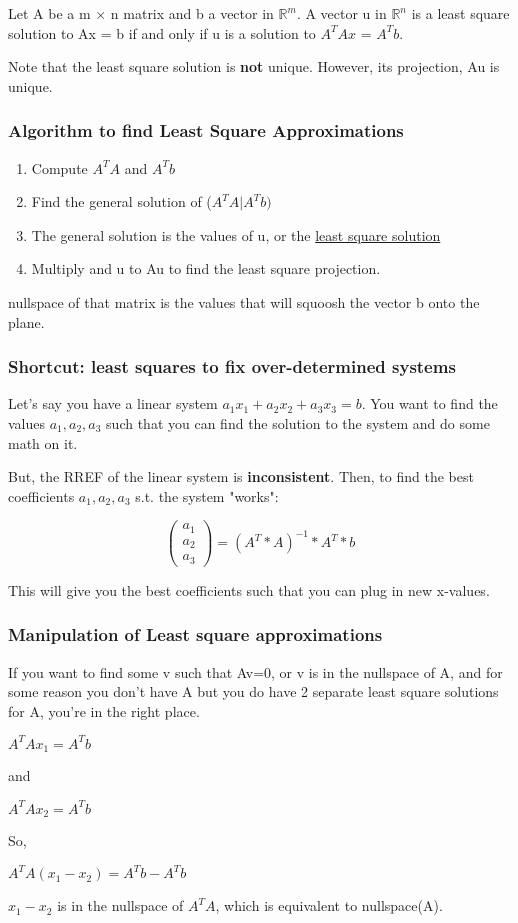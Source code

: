 \documentclass{article}
\newcommand{\sbreak}{\vspace{10pt}}
\begin{document}
\sbreak

Let A be a m × n matrix and b a vector in $\mathbb{R}^m$. A vector u in $\mathbb{R}^n$ is a least square solution to Ax = b if and only if u
is a solution to $A^T Ax$ = $A^T b$.

\sbreak


Note that the least square solution is \textbf{not} unique. However, its projection, Au is unique.

\subsubsection{Algorithm to find Least Square Approximations}
\begin{enumerate}
    \item Compute $A^TA$ and $A^Tb$
    \item Find the general solution of ($A^TA | A^Tb)$
    \item The general solution is the values of u, or the \underline{least square solution}
    \item Multiply and u to Au to find the least square projection.
\end{enumerate}
nullspace of that matrix is the values that will squoosh the vector b onto the plane.

\subsubsection{Shortcut: least squares to fix over-determined systems}
Let's say you have a linear system $a_1x_1 + a_2x_2 + a_3x_3 = b$. You want to find the values $a_1, a_2, a_3$ such that you can find the solution to the system and do some math on it.

But, the RREF of the linear system is \textbf{inconsistent}. Then, to find the best coefficients $a_1, a_2, a_3$ s.t. the system "works":
\begin{center}
    \[
    \begin{pmatrix}
        a_1\\
        a_2\\
        a_3
    \end{pmatrix} = 
    (A^T * A)^{-1} * A^T * b
    \]
\end{center}
This will give you the best coefficients such that you can plug in new x-values.

\subsubsection{Manipulation of Least square approximations}
If you want to find some v such that Av=0, or v is in the nullspace of A, and for some reason you don't have A but you do have 2 separate least square solutions for A, you're in the right place.
\begin{center}
    $A^TAx_1 = A^Tb$
    
    and

    $A^TAx_2 = A^Tb$

    So,

    $A^TA(x_1 - x_2) = A^Tb - A^Tb$
\end{center}
$x_1 - x_2$ is in the nullspace of $A^TA$, which is equivalent to nullspace(A).
\end{document}
